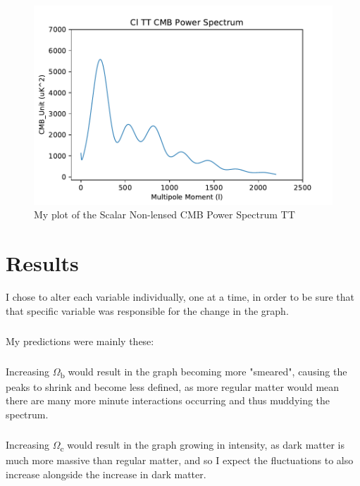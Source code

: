 \documentclass[twoside, fontsize=12pt,
     bibliography=totoc, %
     listof=totoc, %
     index=totoc, %
     onehalfspacing %
]{_MScDiss2017_cls}
\begin{document}
\begin{figure}[t]
  \begin{center}
  \includegraphics{2Cl-TT-vs-l.pdf}
  \caption{My plot of the Scalar Non-lensed CMB Power Spectrum TT} 
  \label{fig:TT}
  \end{center}
\end{figure}

\chapter{Results}

I chose to alter each variable individually, one at a time, in order to be sure that that specific variable was responsible for the change in the graph.

\paragraph{}

My predictions were mainly these:
\paragraph{}
Increasing $\Omega$\textsubscript{b} would result in the graph becoming more "smeared", causing the peaks to shrink and become less defined, as more regular matter would mean there are many more minute interactions occurring and thus muddying the spectrum.
\paragraph{}
Increasing $\Omega$\textsubscript{c} would result in the graph growing in intensity, as dark matter is much more massive than regular matter, and so I expect the fluctuations to also increase alongside the increase in dark matter.
\end{document}
